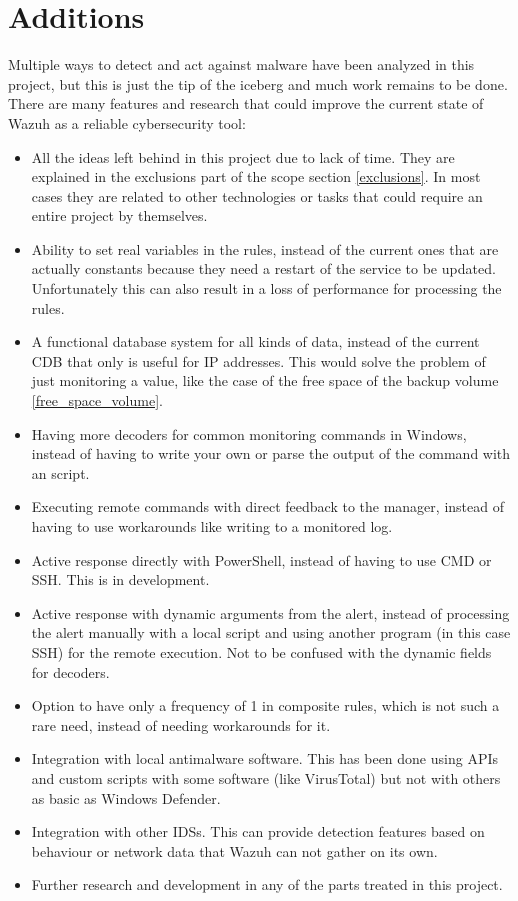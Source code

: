 \section{Additions}
Multiple ways to detect and act against malware have been analyzed in this project, but this is just the tip of the iceberg and much work remains to be done.
There are many features and research that could improve the current state of Wazuh as a reliable cybersecurity tool:
\begin{itemize}
	\item All the ideas left behind in this project due to lack of time. They are explained in the exclusions part of the scope section \ref{exclusions}.
In most cases they are related to other technologies or tasks that could require an entire project by themselves.
	\item Ability to set real variables in the rules, instead of the current ones that are actually constants because they need a restart of the service to be updated.
Unfortunately this can also result in a loss of performance for processing the rules.
	\item A functional database system for all kinds of data, instead of the current CDB that only is useful for IP addresses. This would solve the problem of just monitoring a value, like the case of the free space of the backup volume \ref{free_space_volume}.
	\item Having more decoders for common monitoring commands in Windows, instead of having to write your own or parse the output of the command with an script.
	\item Executing remote commands with direct feedback to the manager, instead of having to use workarounds like writing to a monitored log.
	\item Active response directly with PowerShell, instead of having to use CMD or SSH. This is in development.
	\item Active response with dynamic arguments from the alert, instead of processing the alert manually with a local script and using another program (in this case SSH) for the remote execution. Not to be confused with the dynamic fields for decoders.
	\item Option to have only a frequency of 1 in composite rules, which is not such a rare need, instead of needing workarounds for it.
	\item Integration with local antimalware software. This has been done using APIs and custom scripts with some software (like VirusTotal) but not with others as basic as Windows Defender.
	\item Integration with other IDSs. This can provide detection features based on behaviour or network data that Wazuh can not gather on its own.
	\item Further research and development in any of the parts treated in this project.
\end{itemize}
